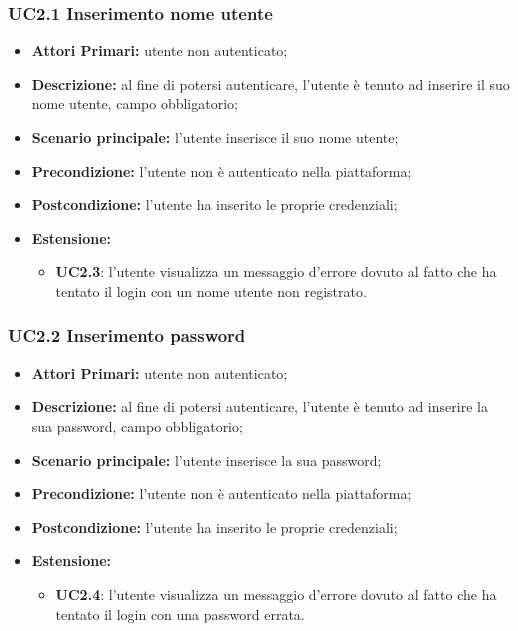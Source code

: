 \subsubsection{UC2.1 Inserimento nome utente}
\begin{itemize}
	\item \textbf{Attori Primari:} utente non autenticato;
	\item \textbf{Descrizione:} al fine di potersi autenticare, l'utente è tenuto ad inserire il suo nome utente, campo obbligatorio;
	\item \textbf{Scenario principale:} l'utente inserisce il suo nome utente;
	\item \textbf{Precondizione:} l'utente non è autenticato nella piattaforma;
	\item \textbf{Postcondizione:} l'utente ha inserito le proprie credenziali;
	\item \textbf{Estensione:}
	\begin{itemize}
		\item \textbf{UC2.3}: l'utente visualizza un messaggio d'errore dovuto al fatto che ha tentato il login con un nome utente non registrato.
	\end{itemize}
\end{itemize}	

\subsubsection{UC2.2 Inserimento password}
\begin{itemize}
	\item \textbf{Attori Primari:} utente non autenticato;
	\item \textbf{Descrizione:} al fine di potersi autenticare, l'utente è tenuto ad inserire la sua password, campo obbligatorio;
	\item \textbf{Scenario principale:} l'utente inserisce la sua password;
	\item \textbf{Precondizione:} l'utente non è autenticato nella piattaforma;
	\item \textbf{Postcondizione:} l'utente ha inserito le proprie credenziali;
	\item \textbf{Estensione:}
	\begin{itemize}
		\item \textbf{UC2.4}: l'utente visualizza un messaggio d'errore dovuto al fatto che ha tentato il login con una password errata.
	\end{itemize}
\end{itemize}	


